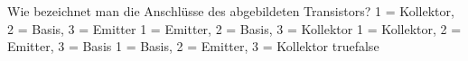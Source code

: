     {Wie bezeichnet man die Anschlüsse des abgebildeten Transistors?}
    {1 = Kollektor, 2 = Basis, 3 = Emitter}
    {1 = Emitter, 2 = Basis, 3 = Kollektor}
    {1 = Kollektor, 2 = Emitter, 3 = Basis}
    {1 = Basis, 2 = Emitter, 3 = Kollektor}
    {true}{false}